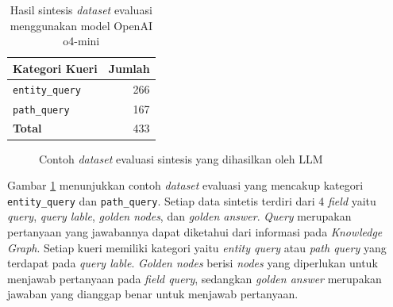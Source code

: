 \begin{table}[H]
	\centering
	\caption{Hasil sintesis \textit{dataset} evaluasi menggunakan model OpenAI o4-mini}
	\label{tab:evaluation-dataset-result}
	\begin{tabular}{|l|r|}
		\hline
		\textbf{Kategori Kueri} & \textbf{Jumlah} \\
		\hline \hline
		\texttt{entity\_query}  &
		266                                       \\
		\hline
		\texttt{path\_query}    &
		167                                       \\
		\hline
		\textbf{Total}          &
		433                                       \\
		\hline
	\end{tabular}
\end{table}


\begin{figure}[H]
	\centering
	\caption{Contoh \textit{dataset} evaluasi sintesis yang dihasilkan oleh LLM}
	\label{fig:evaluation-dataset-example}
\end{figure}

Gambar \ref{fig:evaluation-dataset-example} menunjukkan contoh \textit{dataset} evaluasi yang mencakup kategori \\ \texttt{entity\_query} dan \texttt{path\_query}.
Setiap data sintetis terdiri dari 4 \textit{field} yaitu \textit{query}, \textit{query lable}, \textit{golden nodes}, dan \textit{golden answer}.
\textit{Query} merupakan pertanyaan yang jawabannya dapat diketahui dari informasi pada \textit{Knowledge Graph}.
Setiap kueri memiliki kategori yaitu \textit{entity query} atau \textit{path query} yang terdapat pada \textit{query lable}.
\textit{Golden nodes} berisi \textit{nodes} yang diperlukan untuk menjawab pertanyaan pada \textit{field query}, sedangkan \textit{golden answer} merupakan jawaban yang dianggap benar untuk menjawab pertanyaan.

